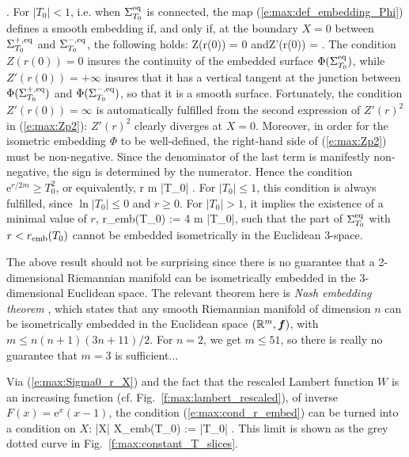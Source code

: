      .
\ee
For $|T_0|<1$, i.e. when $\Sigma_{T_0}^{\rm eq}$ is connected, the
map (\ref{e:max:def_embedding_Phi}) defines a smooth embedding if, and only
if, at the boundary $X=0$ between $\Sigma_{T_0}^{+,\rm eq}$ and
$\Sigma_{T_0}^{-,\rm eq}$, the following holds:
\be
    Z(r(0)) = 0 \quad\mbox{and}\quad Z'(r(0)) = \infty .
\ee
The condition $Z(r(0)) = 0$ insures the continuity of the embedded surface
$\Phi(\Sigma_{T_0}^{\rm eq})$,
while $Z'(r(0)) = +\infty$ insures that it has a vertical tangent at
the junction between $\Phi(\Sigma_{T_0}^{+,\rm eq})$ and
$\Phi(\Sigma_{T_0}^{-,\rm eq})$, so that it is
a smooth surface. Fortunately, the condition $Z'(r(0)) = \infty$
is automatically fulfilled from the second expression of
$Z'(r)^2$ in (\ref{e:max:Zp2}): $Z'(r)^2$ clearly diverges at $X=0$.
Moreover, in order for the isometric embedding $\Phi$ to be well-defined, the right-hand side
of (\ref{e:max:Zp2}) must be non-negative. Since the denominator of the last
term is manifestly non-negative, the sign is determined by the numerator. Hence
the condition $\mathrm{e}^{r/2m} \geq T_0^2$, or equivalently,
\be \label{e:max:cond_r_embed}
    r  m \ln |T_0| .
\ee
For $|T_0|\leq 1$, this condition is always fulfilled, since $\ln |T_0| \leq 0$
and $r \geq 0$. For $|T_0| > 1$, it implies the existence of a minimal value
of $r$,
\be \label{e:max:r_emb}
    r_{\rm emb}(T_0) :=  4 m \ln |T_0|,
\ee
such that the part of $\Sigma_{T_0}^{\rm eq}$ with $r< r_{\rm emb}(T_0)$
cannot be embedded isometrically in the Euclidean 3-space.
\begin{remark}
The above result should not be surprising since there is
no guarantee that a 2-dimensional Riemannian manifold can
be isometrically embedded in the 3-dimensional Euclidean space.
The relevant theorem here is \emph{Nash embedding theorem} \cite{Nash56}, which
states that any smooth Riemannian manifold of dimension $n$ can be isometrically
embedded in the Euclidean space $(\mathbb{R}^m,\bm{f})$, with $m \leq n(n+1)(3n+11)/2$.
For $n=2$, we get $m\leq 51$, so there is really no guarantee that $m=3$
is sufficient...
\end{remark}

Via (\ref{e:max:Sigma0_r_X}) and the fact that the rescaled Lambert function
$W$ is an increasing function (cf. Fig.~\ref{f:max:lambert_rescaled}), of inverse $F(x)=\mathrm{e}^x(x-1)$,
the condition (\ref{e:max:cond_r_embed}) can be turned into a condition
on $X$:
\be
    |X| \geq X_{\rm emb}(T_0) := |T_0|  .
\ee
This limit is shown as the grey dotted curve in Fig.~\ref{f:max:constant_T_slices}.


